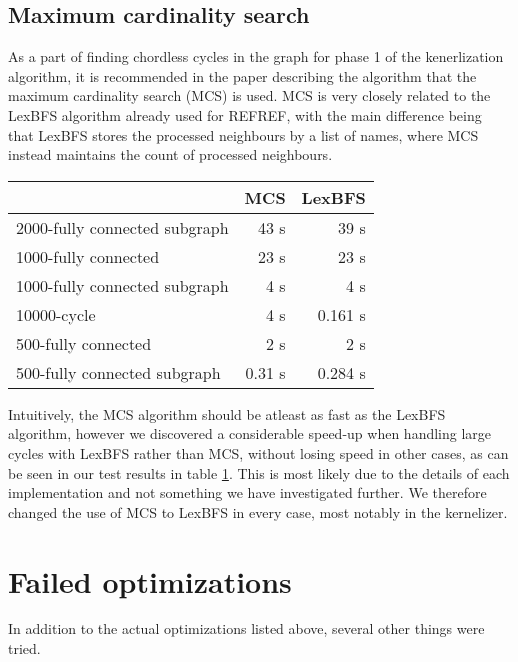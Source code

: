 \documentclass{article}
\begin{document}
		\subsection{Maximum cardinality search}
		\label{subsec:maximum-cardinality-search}
		As a part of finding chordless cycles in the graph for phase 1 of the kenerlization algorithm, it is recommended in the paper describing the algorithm\cite{kernel} that the maximum cardinality search (MCS) is used.
		MCS is very closely related to the LexBFS algorithm already used for REFREF, with the main difference being that LexBFS stores the processed neighbours by a list of names, where MCS instead maintains the count of processed neighbours.

		\begin{table}[!ht]
			\begin{tabular}{| l | r | r |}
			\hline
											& MCS 		& LexBFS 	\\ \hline
			2000-fully connected subgraph	& 43 s  	& 39 s 		\\ \hline
			1000-fully connected 			& 23 s 		& 23 s 		\\ \hline
			1000-fully connected subgraph	& 4 s   	& 4 s 		\\ \hline
			10000-cycle 					& 4 s   	& 0.161 s 	\\ \hline 
			500-fully connected 			& 2 s   	& 2 s 		\\ \hline 
			500-fully connected subgraph 	& 0.31 s 	& 0.284 s 	\\ \hline 
			\end{tabular}
			\label{table:maximum-cardinality-search}
		\end{table}
		Intuitively, the MCS algorithm should be atleast as fast as the LexBFS algorithm, however we discovered a considerable speed-up when handling large cycles with LexBFS rather than MCS, without losing speed in other cases, as can be seen in our test results in table \ref{table:maximum-cardinality-search}.
		This is most likely due to the details of each implementation and not something we have investigated further.
		We therefore changed the use of MCS to LexBFS in every case, most notably in the kernelizer.

	\section{Failed optimizations}
	In addition to the actual optimizations listed above, several other things were tried.
\end{document}
